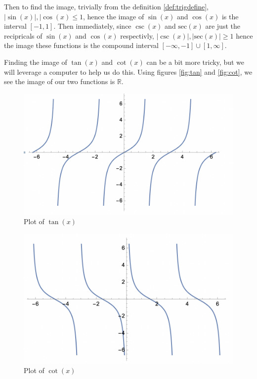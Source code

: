 \documentclass[11pt]{article}
\numberwithin{lemma}{section}
\numberwithin{equation}{section}
\numberwithin{define}{section}
\numberwithin{prop}{section}
\numberwithin{figure}{section}
\numberwithin{theorem}{section}
\numberwithin{cor}{section}
\newcounter{ex}[section]
\numberwithin{ex}{section}
\def\real{\mathbb{R}}
\begin{document}
Then to find the image, trivially from the definition \eqref{def:trigdefine}, $|\sin(x)|,|\cos(x)\le 1$, hence the image of $\sin(x)$ and $\cos(x)$ is the interval $[-1,1]$.
Then immediately, since $\csc(x)$ and $\text{sec}(x)$ are just the recipricals of $\sin(x)$ and $\cos(x)$ respectivly, $|\csc(x)|,|\text{sec}(x)|\ge 1$ hence the image these functions is the compound interval $[-\infty,-1]\cup[1,\infty]$.

Finding the image of $\tan(x)$ and $\cot(x)$ can be a bit more tricky, but we will leverage a computer to help us do this. Using figures \eqref{fig:tan} and \eqref{fig:cot}, we see the image of our two functions is $\real$.
\begin{figure}[h]
	\centering
	\includegraphics[scale=0.6]{assets/Lesson5/tanplot.png}
	\caption{Plot of $\tan(x)$}
	\label{fig:tan}
\end{figure}
\begin{figure}[h]
	\centering
	\includegraphics[scale=0.6]{assets/Lesson5/cotplot.png}
	\caption{Plot of $\cot(x)$}
	\label{fig:cot}
\end{figure}
\end{document}
